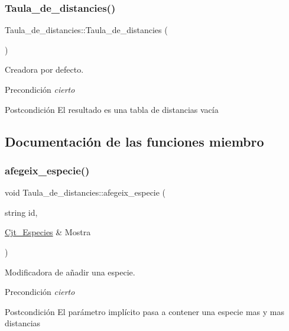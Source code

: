 \subsubsection{\texorpdfstring{Taula\+\_\+de\+\_\+distancies()}{Taula\_de\_distancies()}}
{\footnotesize\ttfamily Taula\+\_\+de\+\_\+distancies\+::\+Taula\+\_\+de\+\_\+distancies (\begin{DoxyParamCaption}{ }\end{DoxyParamCaption})}



Creadora por defecto. 

\begin{DoxyPrecond}{Precondición}
{\itshape cierto} 
\end{DoxyPrecond}
\begin{DoxyPostcond}{Postcondición}
El resultado es una tabla de distancias vacía 
\end{DoxyPostcond}


\subsection{Documentación de las funciones miembro}
\mbox{\label{class_taula__de__distancies_a6202c78b8a7c330d1be356d86e644a89}} 
\subsubsection{\texorpdfstring{afegeix\+\_\+especie()}{afegeix\_especie()}}
{\footnotesize\ttfamily void Taula\+\_\+de\+\_\+distancies\+::afegeix\+\_\+especie (\begin{DoxyParamCaption}\item[{string}]{id,  }\item[{\hyperlink{class_cjt___especies}{Cjt\+\_\+\+Especies} \&}]{Mostra }\end{DoxyParamCaption})}



Modificadora de añadir una especie. 

\begin{DoxyPrecond}{Precondición}
{\itshape cierto} 
\end{DoxyPrecond}
\begin{DoxyPostcond}{Postcondición}
El parámetro implícito pasa a contener una especie mas y mas distancias 
\end{DoxyPostcond}
\mbox{\label{class_taula__de__distancies_ab7b1113061a5022c4444ff299e143f50}} 
